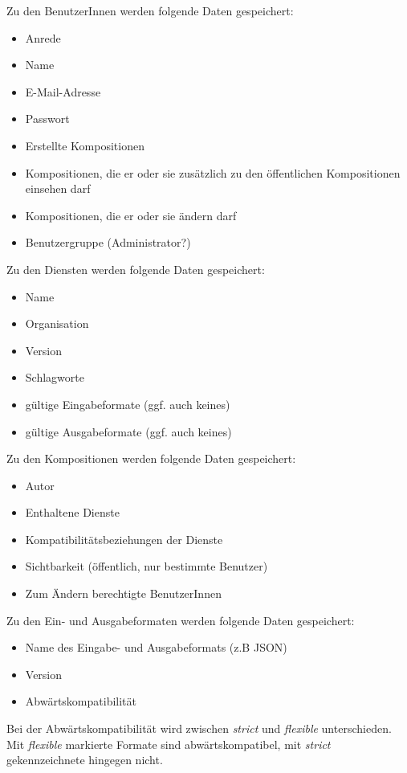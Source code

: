 Zu den BenutzerInnen werden folgende Daten gespeichert:
\begin{itemize}
	\item Anrede
	\item Name
	\item E-Mail-Adresse
	\item Passwort
	\item Erstellte Kompositionen
	\item Kompositionen, die er oder sie zusätzlich zu den öffentlichen Kompositionen einsehen darf
	\item Kompositionen, die er oder sie ändern darf
	\item Benutzergruppe (Administrator?)
\end{itemize}
Zu den Diensten werden folgende Daten gespeichert:
\begin{itemize}
	\item Name
	\item Organisation
	\item Version
	\item Schlagworte
	\item gültige Eingabeformate (ggf. auch keines)
	\item gültige Ausgabeformate (ggf. auch keines)
\end{itemize}
Zu den Kompositionen werden folgende Daten gespeichert:
\begin{itemize}
	\item Autor
	\item Enthaltene Dienste
	\item Kompatibilitätsbeziehungen der Dienste
	\item Sichtbarkeit (öffentlich, nur bestimmte Benutzer)
	\item Zum Ändern berechtigte BenutzerInnen
\end{itemize}

Zu den Ein- und Ausgabeformaten werden folgende Daten gespeichert:
\begin{itemize}
	\item Name des Eingabe- und Ausgabeformats (z.B JSON)
	\item Version
	\item Abwärtskompatibilität\\
\end{itemize}
Bei der Abwärtskompatibilität wird zwischen \textit{strict} und \textit{flexible} unterschieden. Mit \textit{flexible} markierte Formate sind abwärtskompatibel, mit \textit{strict} gekennzeichnete hingegen nicht.
